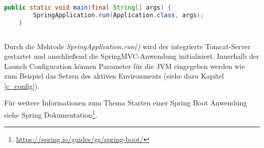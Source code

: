    
   \begin{lstlisting}[caption={Main-Methode},label={lst:label},language=Java]
    public static void main(final String[] args) {
        SpringApplication.run(Application.class, args);
    }
    
   \end{lstlisting}
   
   Durch die Mehtode \emph{SpringApplication.run()} wird der integrierte Tomcat-Server gestartet und anschließend die SpringMVC-Anwendung initialisiert. Innerhalb der Launch Configuration können Parameter für die \ac{JVM} eingegeben werden wie zum Beispiel das Setzen des aktiven Environments (siehe dazu Kapitel \ref{c_config}).
   
   Für weitere Informationen zum Thema Starten einer Spring Boot Anwendung siehe Spring Dokumentation\footnote{\url{https://spring.io/guides/gs/spring-boot/}}.